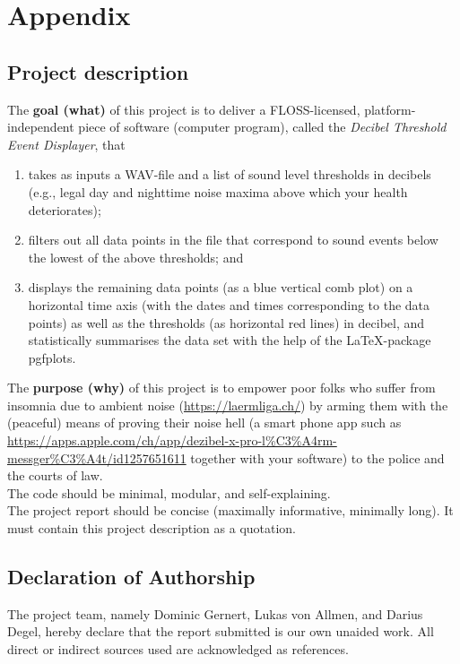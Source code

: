 \section{Appendix}

\subsection{Project description}

The \textbf{goal (what)} of this project is to deliver a FLOSS-licensed, platform-independent piece of
software (computer program), called the \textit{Decibel Threshold Event Displayer}, that

\begin{enumerate}
    \item takes as inputs a WAV-file and a list of sound level thresholds in decibels (e.g., legal day
          and nighttime noise maxima above which your health deteriorates);
    \item filters out all data points in the file that correspond to sound events below the lowest of
          the above thresholds; and
    \item displays the remaining data points (as a blue vertical comb plot) on a horizontal time
          axis (with the dates and times corresponding to the data points) as well as the
          thresholds (as horizontal red lines) in decibel, and statistically summarises the data set
          with the help of the LaTeX-package pgfplots.
\end{enumerate}

The \textbf{purpose (why)} of this project is to empower poor folks who suffer from insomnia due to
ambient noise (\url{https://laermliga.ch/}) by arming them with the (peaceful) means of proving
their noise hell (a smart phone app such as \url{https://apps.apple.com/ch/app/dezibel-x-pro-l\%C3\%A4rm-messger\%C3\%A4t/id1257651611}
together with your software) to the police and the courts of law. \\

The code should be minimal, modular, and self-explaining. \\

The project report should be concise (maximally informative, minimally long). It must contain
this project description as a quotation.

\subsection{Declaration of Authorship}
The project team, namely Dominic Gernert, Lukas von Allmen, and Darius Degel, hereby declare that the report submitted is our own unaided work. All direct or indirect sources used are acknowledged as references.
